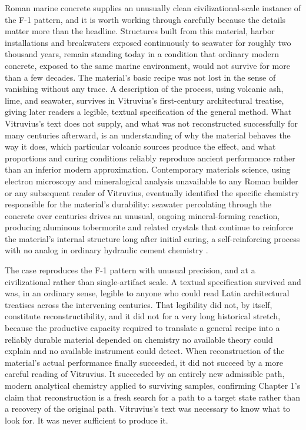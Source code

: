 \documentclass[11pt]{book}
\begin{document}
Roman marine concrete supplies an unusually clean civilizational-scale instance of the F-1 pattern, and it is worth working through carefully because the details matter more than the headline. Structures built from this material, harbor installations and breakwaters exposed continuously to seawater for roughly two thousand years, remain standing today in a condition that ordinary modern concrete, exposed to the same marine environment, would not survive for more than a few decades. The material's basic recipe was not lost in the sense of vanishing without any trace. A description of the process, using volcanic ash, lime, and seawater, survives in Vitruvius's first-century architectural treatise, giving later readers a legible, textual specification of the general method. What Vitruvius's text does not supply, and what was not reconstructed successfully for many centuries afterward, is an understanding of why the material behaves the way it does, which particular volcanic sources produce the effect, and what proportions and curing conditions reliably reproduce ancient performance rather than an inferior modern approximation. Contemporary materials science, using electron microscopy and mineralogical analysis unavailable to any Roman builder or any subsequent reader of Vitruvius, eventually identified the specific chemistry responsible for the material's durability: seawater percolating through the concrete over centuries drives an unusual, ongoing mineral-forming reaction, producing aluminous tobermorite and related crystals that continue to reinforce the material's internal structure long after initial curing, a self-reinforcing process with no analog in ordinary hydraulic cement chemistry \cite{jackson2017}.

The case reproduces the F-1 pattern with unusual precision, and at a civilizational rather than single-artifact scale. A textual specification survived and was, in an ordinary sense, legible to anyone who could read Latin architectural treatises across the intervening centuries. That legibility did not, by itself, constitute reconstructibility, and it did not for a very long historical stretch, because the productive capacity required to translate a general recipe into a reliably durable material depended on chemistry no available theory could explain and no available instrument could detect. When reconstruction of the material's actual performance finally succeeded, it did not succeed by a more careful reading of Vitruvius. It succeeded by an entirely new admissible path, modern analytical chemistry applied to surviving samples, confirming Chapter 1's claim that reconstruction is a fresh search for a path to a target state rather than a recovery of the original path. Vitruvius's text was necessary to know what to look for. It was never sufficient to produce it.
\end{document}
